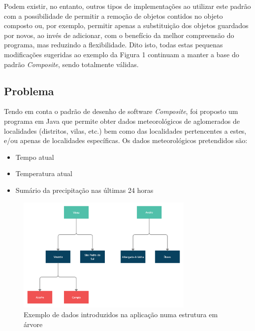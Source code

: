 \documentclass[10pt,portuguese]{article}
\begin{document}
\par Podem existir, no entanto, outros tipos de implementações ao utilizar este padrão com a possibilidade de permitir a remoção de objetos contidos no objeto composto ou, por exemplo, permitir apenas a substituição dos objetos guardados por novos, ao invés de adicionar, com o benefício da melhor compreensão do programa, mas reduzindo a flexibilidade. Dito isto, todas estas pequenas modificações sugeridas ao exemplo da Figura 1 continuam a manter a base do padrão \textit{Composite}, sendo totalmente válidas.

\clearpage
\subsection{Problema}

\par Tendo em conta o padrão de desenho de software \textit{Composite}, foi proposto um programa em Java que permite obter dados meteorológicos de aglomerados de localidades (distritos, vilas, etc.) bem como das localidades pertencentes a estes, e/ou apenas de localidades específicas. Os dados meteorológicos pretendidos são:
\begin{itemize}
    \item Tempo atual
    \item Temperatura atual
    \item Sumário da precipitação nas últimas 24 horas
\end{itemize}

\begin{figure}[!h]
    \centering
    \includegraphics[width=325]{images/composite/tree.png}
    \caption{Exemplo de dados introduzidos na aplicação numa estrutura em árvore}
\end{figure}
\end{document}
